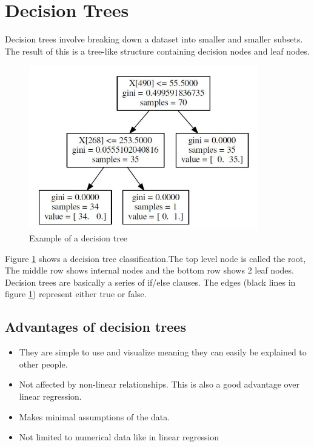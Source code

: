 \section{Decision Trees}

Decision trees involve breaking down a dataset into smaller and smaller subsets. The result of this is a tree-like structure containing decision nodes and leaf nodes.

\begin{figure}[H]
  \centering
  \includegraphics[scale=0.5,width=100mm]{./images/decision-tree-example.jpg}
  \caption{Example of a decision tree}
  \label{fig:abalone-decision-tree}
\end{figure}

Figure \ref{fig:abalone-decision-tree} \cite{decisionTreeExample} shows a decision tree classification.The top level node is called the root, The middle row shows internal nodes and the bottom row shows 2 leaf nodes. Decision trees are basically a series of if/else clauses. The edges (black lines in figure \ref{fig:abalone-decision-tree}) represent either true or false.

\subsection{Advantages of decision trees}

\begin{itemize}
  \item They are simple to use and visualize meaning they can easily be explained to other people.
  \item Not affected by non-linear relationships. This is also a good advantage over linear regression.
  \item Makes minimal assumptions of the data.
  \item Not limited to numerical data like in linear regression
\end{itemize}

